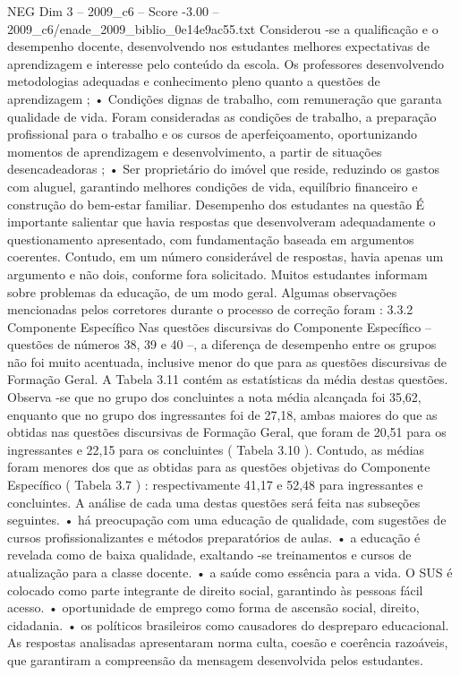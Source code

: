 \begin{textsample}{NEG Dim 3 – 2009\_c6 – Score -3.00 – 2009\_c6/enade\_2009\_biblio\_0e14e9ac55.txt}
Considerou -se a qualificação e o desempenho docente, desenvolvendo nos estudantes melhores expectativas de aprendizagem e interesse pelo conteúdo da escola.
Os professores desenvolvendo metodologias adequadas e conhecimento pleno quanto a questões de aprendizagem ; • Condições dignas de trabalho, com remuneração que garanta qualidade de vida.
Foram consideradas as condições de trabalho, a preparação profissional para o trabalho e os cursos de aperfeiçoamento, oportunizando momentos de aprendizagem e desenvolvimento, a partir de situações desencadeadoras ; • Ser proprietário do imóvel que reside, reduzindo os gastos com aluguel, garantindo melhores condições de vida, equilíbrio financeiro e construção do bem-estar familiar.
Desempenho dos estudantes na questão É importante salientar que havia respostas que desenvolveram adequadamente o questionamento apresentado, com fundamentação baseada em argumentos coerentes.
Contudo, em um número considerável de respostas, havia apenas um argumento e não dois, conforme fora solicitado.
Muitos estudantes informam sobre problemas da educação, de um modo geral.
Algumas observações mencionadas pelos corretores durante o processo de correção foram : 3.3.2 Componente Específico Nas questões discursivas do Componente Específico – questões de números 38, 39 e 40 –, a diferença de desempenho entre os grupos não foi muito acentuada, inclusive menor do que para as questões discursivas de Formação Geral.
A Tabela 3.11 contém as estatísticas da média destas questões.
Observa -se que no grupo dos concluintes a nota média alcançada foi 35,62, enquanto que no grupo dos ingressantes foi de 27,18, ambas maiores do que as obtidas nas questões discursivas de Formação Geral, que foram de 20,51 para os ingressantes e 22,15 para os concluintes ( Tabela 3.10 ).
Contudo, as médias foram menores dos que as obtidas para as questões objetivas do Componente Específico ( Tabela 3.7 ) : respectivamente 41,17 e 52,48 para ingressantes e concluintes.
A análise de cada uma destas questões será feita nas subseções seguintes. • há preocupação com uma educação de qualidade, com sugestões de cursos profissionalizantes e métodos preparatórios de aulas. • a educação é revelada como de baixa qualidade, exaltando -se treinamentos e cursos de atualização para a classe docente. • a saúde como essência para a vida.
O SUS é colocado como parte integrante de direito social, garantindo às pessoas fácil acesso. • oportunidade de emprego como forma de ascensão social, direito, cidadania. • os políticos brasileiros como causadores do despreparo educacional.
As respostas analisadas apresentaram norma culta, coesão e coerência razoáveis, que garantiram a compreensão da mensagem desenvolvida pelos estudantes.

\end{textsample}
